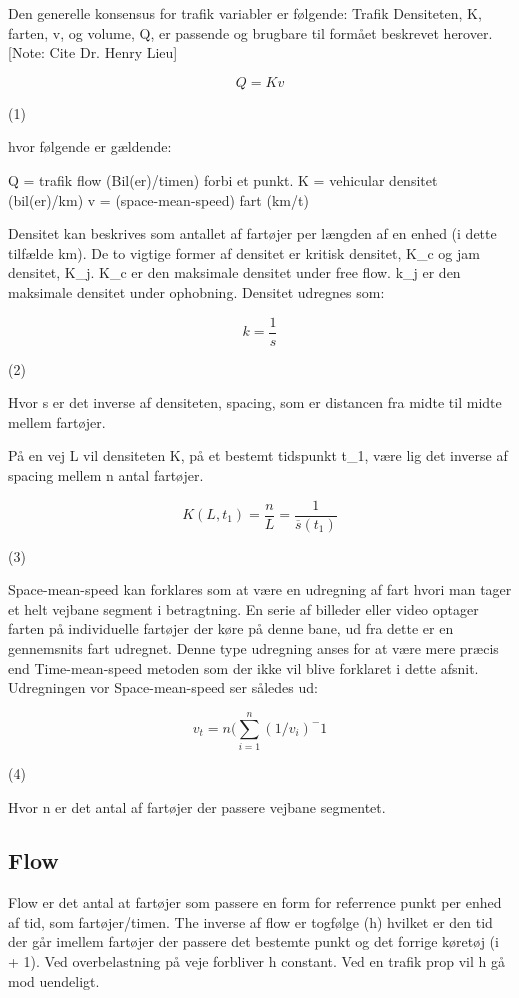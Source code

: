 Den generelle konsensus for trafik variabler er følgende: Trafik Densiteten, K, farten, v, og volume, Q, er passende og brugbare til formået beskrevet herover. [Note: Cite Dr. Henry Lieu]


\[Q = Kv \]\label{eq:Equation1}\begin{flushright}(1)\end{flushright}
						
hvor følgende er gældende:

Q = trafik flow (Bil(er)/timen) forbi et punkt.  
K  = vehicular densitet (bil(er)/km)
v  = (space-mean-speed) fart (km/t)

Densitet kan beskrives som antallet af fartøjer per længden af en enhed (i dette tilfælde km). De to vigtige former af densitet er kritisk densitet, K\_c og jam densitet, K\_j. K\_c er den maksimale densitet under free flow. k\_j er den maksimale densitet under ophobning. Densitet udregnes som:

\[ k = \frac{1}{s} \]\label{eq:Equation2}\begin{flushright}(2)\end{flushright}

Hvor s er det inverse af densiteten, spacing, som er distancen fra midte til midte mellem fartøjer.

På en vej L vil densiteten K, på et bestemt tidspunkt t\_1, være lig det inverse af spacing mellem n antal fartøjer.

\[ K(L,t_1) = \frac{n}{L} = \frac{1}{\overline{s}(t_1)} \]\label{eq:Equation3}\begin{flushright}(3)\end{flushright}

Space-mean-speed kan forklares som at være en udregning af fart hvori man tager et helt vejbane segment i betragtning. En serie af billeder eller video optager farten på individuelle fartøjer der køre på denne bane, ud fra dette er en gennemsnits fart udregnet. Denne type udregning anses for at være mere præcis end Time-mean-speed metoden som der ikke vil blive forklaret i dette afsnit. Udregningen vor Space-mean-speed ser således ud:

\[ v_t = n (\displaystyle\sum_{i=1}^{n}(1/v_i)^-1 \]\label{eq:Equation4}\begin{flushright}(4)\end{flushright}

Hvor n er det antal af fartøjer der passere vejbane segmentet.

\subsection{Flow}
Flow er det antal at fartøjer som passere en form for referrence punkt per enhed af tid, som fartøjer/timen. The inverse af flow er togfølge (h) hvilket er den tid der går imellem fartøjer der passere det bestemte punkt og det forrige køretøj (i + 1). Ved overbelastning på veje forbliver h constant. Ved en trafik prop vil h gå mod uendeligt.

